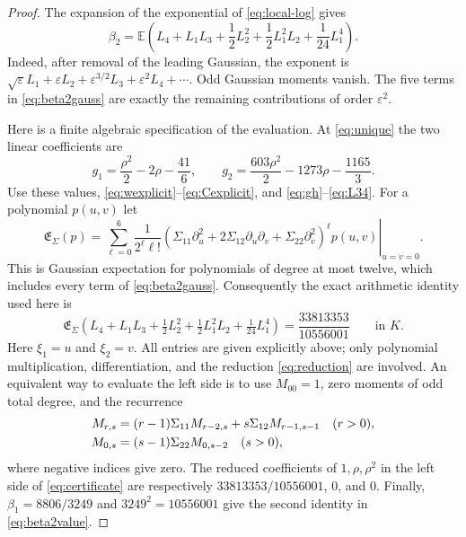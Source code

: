 \documentclass[10pt,a4paper]{amsart}
\newcommand{\EE}{\mathbb E}
\theoremstyle{plain}
\theoremstyle{remark}
\begin{document}
\begin{proof}
The expansion of the exponential of \eqref{eq:local-log} gives
\begin{equation}\label{eq:beta2gauss}
 \beta_2=
 \EE\left(L_4+L_1L_3+\frac12L_2^2
                 +\frac12L_1^2L_2+\frac1{24}L_1^4\right).
\end{equation}
Indeed, after removal of the leading Gaussian, the exponent is
$\sqrt\varepsilon L_1+\varepsilon L_2+
\varepsilon^{3/2}L_3+\varepsilon^2L_4+\cdots$.
Odd Gaussian moments vanish. The five terms in
\eqref{eq:beta2gauss} are exactly the remaining contributions of
order $\varepsilon^2$.

Here is a finite algebraic specification of the evaluation.
At \eqref{eq:unique} the two linear coefficients are
\[
 g_1=\frac{\rho^2}{2}-2\rho-\frac{41}{6},\qquad
 g_2=\frac{603\rho^2}{2}-1273\rho-\frac{1165}{3}.
\]
Use these values, \eqref{eq:wexplicit}--\eqref{eq:Cexplicit}, and
\eqref{eq:gh}--\eqref{eq:L34}.
For a polynomial $p(u,v)$ let
\[
 \mathfrak E_\Sigma(p)=
 \left.
 \sum_{\ell=0}^{6}\frac1{2^\ell\ell!}
 \left(\Sigma_{11}\partial_u^2+
       2\Sigma_{12}\partial_u\partial_v+
       \Sigma_{22}\partial_v^2\right)^\ell p(u,v)
 \right|_{u=v=0}.
\]
This is Gaussian expectation for polynomials of degree at most twelve,
which includes every term of \eqref{eq:beta2gauss}.
Consequently the exact arithmetic identity used here is
\begin{equation}\label{eq:certificate}
 \mathfrak E_\Sigma\left(
 L_4+L_1L_3+\tfrac12L_2^2+
 \tfrac12L_1^2L_2+\tfrac1{24}L_1^4
 \right)
 =\frac{33813353}{10556001}\qquad\text{in }K.
\end{equation}
Here $\xi_1=u$ and $\xi_2=v$. All entries are given explicitly above; only polynomial
multiplication, differentiation, and the reduction
\eqref{eq:reduction} are involved. An equivalent way to evaluate the
left side is to use $M_{00}=1$, zero moments of odd total degree,
and the recurrence
\begin{align}
 M_{r,s}&=(r-1)\Sigma_{11}M_{r-2,s}
              +s\Sigma_{12}M_{r-1,s-1}\quad(r>0),\notag\\
 M_{0,s}&=(s-1)\Sigma_{22}M_{0,s-2}\quad(s>0),
 \label{eq:momentrecurrence}
\end{align}
where negative indices give zero.
The reduced coefficients of $1,\rho,\rho^2$ in the left side of
\eqref{eq:certificate} are respectively
$33813353/10556001$, $0$, and $0$.
Finally, $\beta_1=8806/3249$ and $3249^2=10556001$ give
the second identity in \eqref{eq:beta2value}.
\end{proof}
\end{document}
